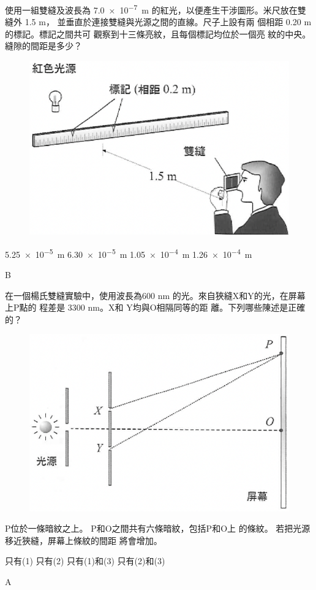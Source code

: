 {
    使用一組雙縫及波長為 \qty{7.0e-7}{m} 的紅光，以便產生干涉圖形。米尺放在雙縫外 1.5 m， 並垂直於連接雙縫與光源之間的直線。尺子上設有兩 個相距 0.20 m 的標記。標記之間共可 觀察到十三條亮紋，且每個標記均位於一個亮 紋的中央。縫隙的間距是多少？
    \begin{figure}[h!]
        \centering
        \includegraphics[width=.3\textwidth]{assets/2c8c3161.png}
    \end{figure}
    \begin{choices}
        \choice \qty{5.25e-5}{m}
        \CorrectChoice \qty{6.30e-5}{m}
        \choice \qty{1.05e-4}{m}
        \choice \qty{1.26e-4}{m}
    \end{choices}
}{\mckey B}

{
    在一個楊氏雙縫實驗中，使用波長為600 nm 的光。來自狹縫X和Y的光，在屏幕上P點的 程差是 3300 nm。X和 Y均與O相隔同等的距 離。下列哪些陳述是正確的？
    \begin{figure}[h!]
        \centering
        \includegraphics[width=.3\textwidth]{assets/e6bea960.png}
    \end{figure}

    \begin{statements}
        \task P位於一條暗紋之上。
        \task P和O之間共有六條暗紋，包括P和O上 的條紋。
        \task 若把光源移近狹縫，屏幕上條紋的間距 將會增加。
    \end{statements}



    \begin{choices}
        \CorrectChoice 只有(1)
        \choice 只有(2)
        \choice 只有(1)和(3)
        \choice 只有(2)和(3)
    \end{choices}

}{\mckey A}

